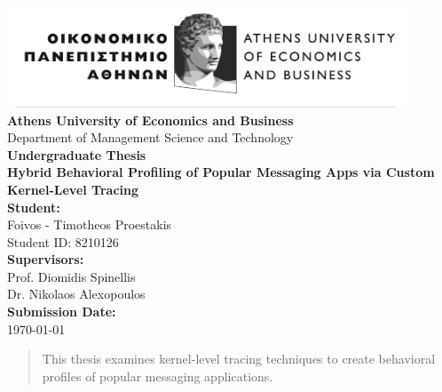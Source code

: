 \documentclass[a4paper,12pt]{report}
\begin{document}
\begin{titlepage}
    \begin{center}
        \vspace*{1.5cm}

        \includegraphics[width=0.9\textwidth]{./aueb_logo.png}\\[1cm]

        {\Large \textbf{Athens University of Economics and Business}}\\[0.5cm]
        {\large Department of Management Science and Technology}\\[1.5cm]

        {\Huge \textbf{Undergraduate Thesis}}\\[1.2cm]
        {\Large \textbf{Hybrid Behavioral Profiling of Popular Messaging Apps
       via Custom Kernel-Level Tracing}}\\[2cm]
        \textbf{Student:}\\
        Foivos - Timotheos Proestakis\\
        Student ID: 8210126\\[1.5cm]

        \textbf{Supervisors:}\\
        Prof. Diomidis Spinellis \\
        Dr. Nikolaos Alexopoulos\\[1.5cm]

        \vfill
        \textbf{Submission Date:}\\
        \today
        \vspace*{1cm}
    \end{center}
\end{titlepage}
\clearpage


\begin{abstract}
This thesis examines kernel-level tracing techniques to create behavioral profiles of popular messaging applications.
\end{abstract}
\clearpage
\end{document}
